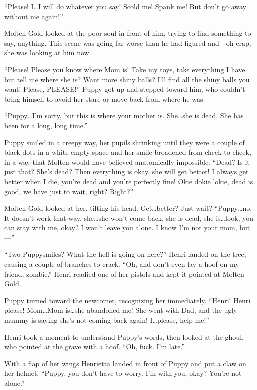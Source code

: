 ``Please! I\dots I will do whatever you say! Scold me! Spank me! But don't go away without me again!''

Molten Gold looked at the poor soul in front of him, trying to find something to say, anything. This scene was going far worse than he had figured and---oh crap, she was looking at him now.

``Please! Please you know where Mom is! Take my toys, take everything I have but tell me where she is? Want more shiny balls? I'll find all the shiny balls you want! Please, PLEASE!'' Puppy got up and stepped toward him, who couldn't bring himself to avoid her stare or move back from where he was.

``Puppy\dots I'm sorry, but this is where your mother is. She\dots she is dead. She has been for a long, long time.''

Puppy smiled in a creepy way, her pupils shrinking until they were a couple of black dots in a white empty space and her smile broadened from cheek to cheek, in a way that Molten would have believed anatomically impossible. ``Dead? Is it just that? She's dead? Then everything is okay, she will get better! I always get better when I die, you're dead and you're perfectly fine! Okie dokie lokie, dead is good, we have just to wait, right? Right?''

Molten Gold looked at her, tilting his head. Get\dots better? Just wait? ``Puppy\dots no. It doesn't work that way, she\dots she won't come back, she is dead, she is\dots look, you can stay with me, okay? I won't leave you alone. I know I'm not your mom, but---''

``Two Puppysmiles? What the hell is going on here?'' Henri landed on the tree, causing a couple of branches to crack. ``Oh, and don't even lay a hoof on my friend, zombie.'' Henri readied one of her pistols and kept it pointed at Molten Gold.

Puppy turned toward the newcomer, recognizing her immediately. ``Henri! Henri please! Mom\dots Mom is\dots she abandoned me! She went with Dad, and the ugly mummy is saying she's not coming back again! I\dots please, help me!''

Henri took a moment to understand Puppy's words, then looked at the ghoul, who pointed at the grave with a hoof. ``Oh, fuck. I'm late.''

With a flap of her wings Henrietta landed in front of Puppy and put a claw on her helmet. ``Puppy, you don't have to worry. I'm with you, okay? You're not alone.''

